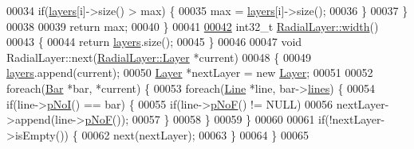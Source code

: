 \begin{DoxyCode}
00034     \textcolor{keywordflow}{if}(\hyperlink{class_radial_layer_a714c36b1ab50a7778953e924ddac2787}{layers}[i]->size() > max) \{
00035       max = \hyperlink{class_radial_layer_a714c36b1ab50a7778953e924ddac2787}{layers}[i]->size();
00036     \}
00037   \}
00038 
00039   \textcolor{keywordflow}{return} max;
00040 \}
00041 
\hypertarget{radiallayer_8cpp_source_l00042}{}\hyperlink{class_radial_layer_ae8b32d0711cc6f4dbec832bb07d59a49}{00042} int32\_t \hyperlink{class_radial_layer_ae8b32d0711cc6f4dbec832bb07d59a49}{RadialLayer::width}()
00043 \{
00044   \textcolor{keywordflow}{return} \hyperlink{class_radial_layer_a714c36b1ab50a7778953e924ddac2787}{layers}.size();
00045 \}
00046 
00047 \textcolor{keywordtype}{void} RadialLayer::next(\hyperlink{class_radial_layer_a65d67f20b05dd45f90ec4252376807b2}{RadialLayer::Layer} *current)
00048 \{
00049   \hyperlink{class_radial_layer_a714c36b1ab50a7778953e924ddac2787}{layers}.append(current);
00050   \hyperlink{class_radial_layer_a65d67f20b05dd45f90ec4252376807b2}{Layer} *nextLayer = \textcolor{keyword}{new} \hyperlink{class_radial_layer_a65d67f20b05dd45f90ec4252376807b2}{Layer};
00051 
00052   \textcolor{keywordflow}{foreach}(\hyperlink{class_bar}{Bar} *bar, *current) \{
00053     \textcolor{keywordflow}{foreach}(\hyperlink{class_line}{Line} *line, bar->\hyperlink{class_bar_a23b6d4319352ef0e77ad66aade4e0209}{lines}) \{
00054       \textcolor{keywordflow}{if}(line->\hyperlink{group___models_gaeafd90e84ac2f8de2a879abe9e53eef3}{pNoI}() == bar) \{
00055         \textcolor{keywordflow}{if}(line->\hyperlink{group___models_gabbc73ddedd3075c33ae5331bd7c9829f}{pNoF}() != NULL)
00056           nextLayer->append(line->\hyperlink{group___models_gabbc73ddedd3075c33ae5331bd7c9829f}{pNoF}());
00057       \}
00058     \}
00059   \}
00060 
00061   \textcolor{keywordflow}{if}(!nextLayer->isEmpty()) \{
00062     next(nextLayer);
00063   \}
00064 \}
00065 
\end{DoxyCode}
